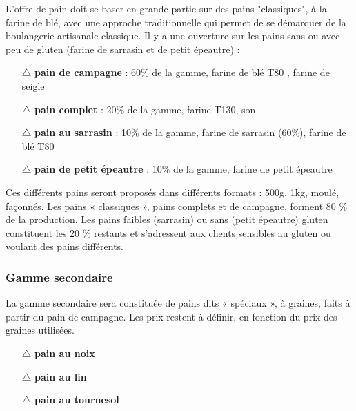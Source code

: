 \documentclass{book}
\begin{document}
L'offre de pain doit se baser en grande partie sur des pains "classiques", à la farine de blé, avec une approche traditionnelle qui permet de se démarquer de la boulangerie artisanale classique. Il y a une ouverture sur les pains sans ou avec peu de gluten (farine de sarrasin et de petit épeautre) :

\begin{itemize}

	\item[$\triangle$] \textbf{pain de campagne} : 60\% de la gamme, farine de blé T80 , farine de seigle
	\item[$\triangle$] \textbf{pain complet} : 20\% de la gamme, farine T130, son
	\item[$\triangle$] \textbf{pain au sarrasin} : 10\% de la gamme, farine de sarrasin (60\%), farine de blé T80
	\item[$\triangle$] \textbf{pain de petit épeautre} : 10\% de la gamme, farine de petit épeautre

\end{itemize}

Ces différents pains seront proposés dans différents formats : 500g, 1kg, moulé, façonnés. Les pains « classiques », pains complets et de campagne, forment 80 \% de la production. Les pains faibles (sarrasin) ou sans (petit épeautre) gluten constituent les 20 \% restants et s’adressent aux clients sensibles au gluten ou voulant des pains différents. 

\subsubsection{Gamme secondaire}

La gamme secondaire sera constituée de pains dits « spéciaux », à graines, faits à partir du pain de campagne. Les prix restent à définir, en fonction du prix des graines utilisées. 
\begin{itemize}

	\item[$\triangle$] \textbf{pain au noix}
	\item[$\triangle$] \textbf{pain au lin}
	\item[$\triangle$] \textbf{pain au tournesol}

\end{itemize}
      
\end{document}
